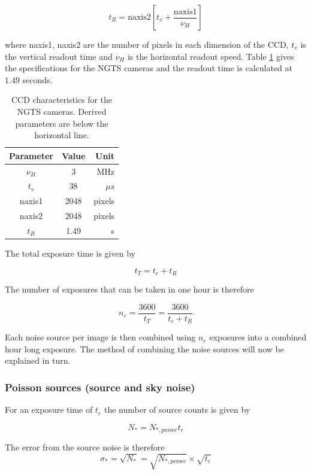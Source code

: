 \documentclass[11pt,a4paper]{report}
\begin{document}
\[
    t_R = \mathrm{naxis2} \left[t_v + \frac{\mathrm{naxis1}}{\nu_H}\right]
    \]

where naxis1, naxis2 are the number of pixels in each dimension of the
CCD, $t_v$ is the vertical readout time and $\nu_H$ is the horizontal
readout speed. Table \ref{tab:ccdparams} gives the specifications for
the NGTS cameras and the readout time is calculated at $1.49$ seconds.

\begin{table}
    \centering
    \begin{tabular}{ccr}
        \toprule
        Parameter & Value & Unit \\
        \midrule
        $\nu_H$ & $3$ & MHz \\
        $t_v$ & $38$ &  $\mu s$ \\
        naxis1 & 2048 & pixels \\
        naxis2 & 2048 & pixels \\
        \midrule
        $t_R$ & 1.49 & s \\
        \bottomrule
    \end{tabular}
    \caption{CCD characteristics for the NGTS cameras. Derived
    parameters are below the horizontal line.}
    \label{tab:ccdparams}
\end{table}

The total exposure time is given by 

\[
    t_T = t_e + t_R
    \]


The number of exposures that can be taken in one hour is therefore 

\[
    n_{e} = \frac{3600}{t_T} = \frac{3600}{t_e + t_R}
    \]

Each noise source per image is then combined using $n_e$ exposures into
a combined hour long exposure. The method of combining the  noise sources 
will now be explained in turn.

\subsubsection{Poisson sources (source and sky noise)}

For an exposure time of $t_e$ the number of source counts is given by

\[
    N_{\ast} = N_{\ast,\mathrm{per sec}} t_e
    \]

The error from the source noise is therefore
\[
    \sigma_{\ast} = \sqrt{N_{\ast}} = \sqrt{N_{\ast,\mathrm{per sec}}}
    \times \sqrt{t_e}
    \]
\end{document}
